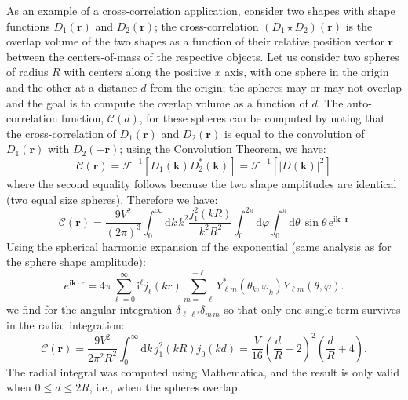 As an example of a cross-correlation application, consider two shapes with shape functions $D_1(\mathbf{r})$ and $D_2(\mathbf{r})$; the cross-correlation $(D_1\star D_2)(\mathbf{r})$ is the overlap volume of the two shapes as a function of their relative position vector $\mathbf{r}$ between the centers-of-mass of the respective objects.  Let us consider two spheres of radius $R$ with centers along the positive $x$ axis, with one sphere in the origin and the other at a distance $d$ from the origin; the spheres may or may not overlap and the goal is to compute the overlap volume as a function of $d$.  The auto-correlation function, $\mathcal{C}(d)$, for these spheres can be computed by noting that the cross-correlation of $D_1(\mathbf{r})$ and $D_2(\mathbf{r})$ is equal to the convolution of $D_1(\mathbf{r})$ with $D_2(-\mathbf{r})$; using the Convolution Theorem, we have:
\[
	\mathcal{C}(\mathbf{r}) = \mathcal{F}^{-1}\left[D_1(\mathbf{k})D^{\ast}_2(\mathbf{k})\right] = \mathcal{F}^{-1}\left[ \vert D(\mathbf{k})\vert^2 \right]
\]
where the second equality follows because the two shape amplitudes are identical (two equal size spheres). Therefore we have:
\[
	\mathcal{C}(\mathbf{r}) = \frac{9V^2 }{(2\pi)^3}\int_0^{\infty}\!\!\!\mathrm{d}k\,k^2 \frac{j^2_1(kR)}{k^2R^2}  \int_0^{2\pi}\!\!\!\mathrm{d}\varphi\int_0^{\pi}\!\!\!\mathrm{d}\theta\,\sin\theta\, \mathrm{e}^{\mathrm{i}\mathbf{k}\cdot\mathbf{r}}
\]
Using the spherical harmonic expansion of the exponential (same analysis as for the sphere shape amplitude):
\[
	e^{\mathrm{i}\mathbf{k}\cdot\mathbf{r}} = 4\pi\sum_{\ell=0}^{\infty}\mathrm{i}^{\ell} j_{\ell}(kr)\sum_{m=-\ell}^{+\ell} Y^{\ast}_{\ell m}(\theta_k,\varphi_k)Y_{\ell m}(\theta,\varphi).
\]
we find for the angular integration $\delta_{\ell\,\ell'}\delta_{m\, m}$ so that only one single term survives in the radial integration: 
\[
	\mathcal{C}(\mathbf{r}) =\frac{9V^2}{2\pi^2R^2} \int_0^{\infty}\!\!\!\mathrm{d}k\, j^2_1(kR) j_0(kd) = \frac{V}{16}\left(\frac{d}{R}-2\right)^2\left(\frac{d}{R}+4\right).
\]
The radial integral was computed using Mathematica, and the result is only valid when $0\le d\le 2R$, i.e., when the spheres overlap.

